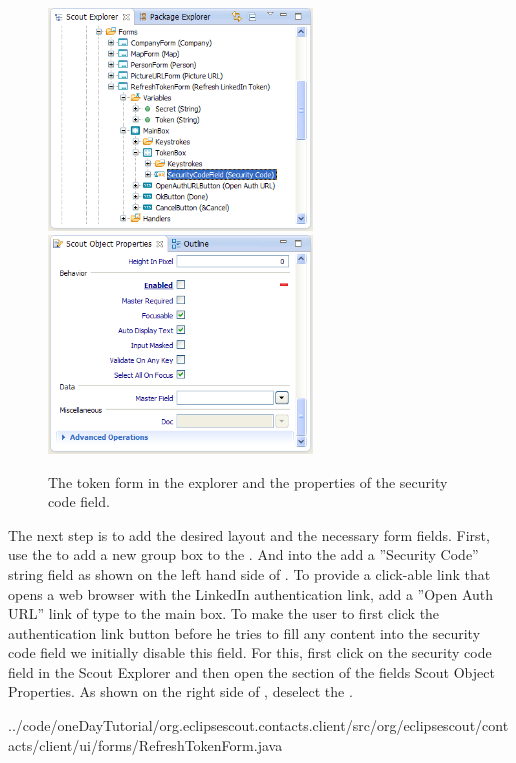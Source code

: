 \documentclass[a4paper,10pt,twoside]{book}
\begin{document}
\begin{figure}
\includegraphics[width=7cm]{tokenform_securitycode_explorer.png} \hspace{5mm}
\includegraphics[width=7cm]{tokenform_securitycode_properties.png}
\caption{The token form in the explorer and the properties of the security code field.}
\end{figure}

The next step is to add the desired layout and the necessary form fields. 
First, use the  to add a new group box  to the . 
And into the  add a ''Security Code'' string field as shown on the left hand side of . 
To provide a click-able link that opens a web browser with the LinkedIn authentication link, add a ''Open Auth URL'' link of type  to the main box. 
To make the user to first click the authentication link button before he tries to fill any content into the security code field we initially disable this field. 
For this, first click on the security code field in the Scout Explorer and then open the  section of the fields Scout Object Properties. 
As shown on the right side of , deselect the .


{../code/oneDayTutorial/org.eclipsescout.contacts.client/src/org/eclipsescout/contacts/client/ui/forms/RefreshTokenForm.java}
\end{document}
